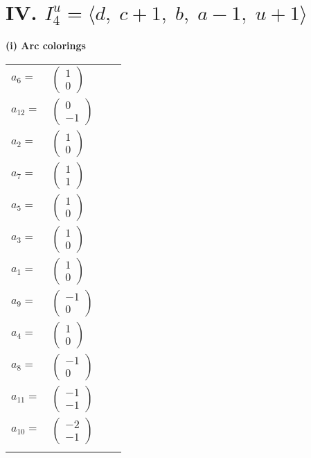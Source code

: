 \documentclass[1p]{elsarticle_modified}
\theoremstyle{definition}
\begin{document}
\centering \section*{IV. $I^u_{4}= \langle d,\;c+1,\;b,\;a-1,\;u+1 \rangle$}
\flushleft \textbf{(i) Arc colorings}\\
\begin{tabular}{m{7pt} m{180pt} m{7pt} m{180pt} }
\flushright $a_{6}=$&$\begin{pmatrix}1\\0\end{pmatrix}$ \\
\flushright $a_{12}=$&$\begin{pmatrix}0\\-1\end{pmatrix}$ \\
\flushright $a_{2}=$&$\begin{pmatrix}1\\0\end{pmatrix}$ \\
\flushright $a_{7}=$&$\begin{pmatrix}1\\1\end{pmatrix}$ \\
\flushright $a_{5}=$&$\begin{pmatrix}1\\0\end{pmatrix}$ \\
\flushright $a_{3}=$&$\begin{pmatrix}1\\0\end{pmatrix}$ \\
\flushright $a_{1}=$&$\begin{pmatrix}1\\0\end{pmatrix}$ \\
\flushright $a_{9}=$&$\begin{pmatrix}-1\\0\end{pmatrix}$ \\
\flushright $a_{4}=$&$\begin{pmatrix}1\\0\end{pmatrix}$ \\
\flushright $a_{8}=$&$\begin{pmatrix}-1\\0\end{pmatrix}$ \\
\flushright $a_{11}=$&$\begin{pmatrix}-1\\-1\end{pmatrix}$ \\
\flushright $a_{10}=$&$\begin{pmatrix}-2\\-1\end{pmatrix}$\\&\end{tabular}
\end{document}
